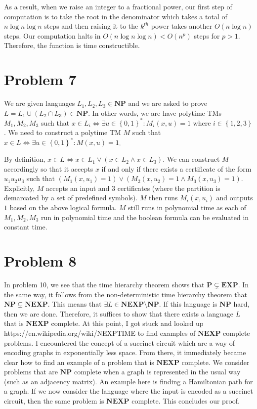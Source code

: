 \documentclass[usletter]{article}
\begin{document}
As a result, when we raise an integer to a fractional power, our first step of computation is to take the root in the denominator which takes a total of \(n \log n \log n\) steps and then raising it to the \(k^{th}\) power takes another \(O(n\log n)\) steps. 
Our computation halts in \(O(n \log n \log n) < O(n^p)\) steps for \( p > 1\). Therefore, the function is time constructible. 

\newpage

\section*{Problem 7}

We are given languages \(L_1, L_2, L_3 \in \mathbf{NP}\) and we are asked to prove \(L = L_1 \cup (L_2 \cap L_3) \in \mathbf{NP}\).
In other words, we are have polytime TMs \(M_1, M_2, M_3\) such that \(x \in L_i \iff \exists u \in \left\{0,1\right\}^* : M_i(x,u) = 1\)
where \(i \in \left\{1,2,3\right\}\). We need to construct a polytime TM \(M\) such that \(x \in L \iff \exists u \in \left\{ 0,1 \right\}^* : M(x,u) = 1\).

By definition, \(x \in L \iff x \in L_1 \lor (x\in L_2 \land x \in L_3)\). We can construct \(M\) accordingly so that it accepts \(x\) if and only if there exists a 
certificate of the form \(u_1u_2u_3\) such that \((M_1(x,u_1) = 1) \lor (M_2(x,u_2) = 1 \land M_3(x,u_3) = 1)\). Explicitly, \(M\) accepts an input and 3 certificates 
(where the partition is demarcated by a set of predefined symbols). \(M\) then runs \(M_i(x,u_i)\) and outputs \(1\) based on the above logical formula. \(M\) still runs in polynomial time
as each of \(M_1, M_2, M_3\) run in polynomial time and the boolean formula can be evaluated in constant time. 

\newpage

\section*{Problem 8}

In problem 10, we see that the time hierarchy theorem shows that \(\mathbf{P} \subsetneq \mathbf{EXP}\). In the same way, it follows from the non-deterministic time hierarchy theorem that 
\(\mathbf{NP}\subsetneq \mathbf{NEXP}\). This means that \(\exists L \in \mathbf{NEXP}\setminus \mathbf{NP}\). If this language is \(\mathbf{NP}\) hard, then we are done. Therefore, it suffices to show that
there exists a language \(L\) that is \(\mathbf{NEXP}\) complete. At this point, I got stuck and looked up https://en.wikipedia.org/wiki/NEXPTIME to find examples of \(\mathbf{NEXP}\) complete problems. I encountered the concept of
a succinct circuit which are a way of encoding graphs in exponentially less space. From there, it immediately became clear how to find an example of a problem that is \(\mathbf{NEXP}\) complete. We consider problems that are \(\mathbf{NP}\) complete
when a graph is represented in the usual way (such as an adjacency matrix). An example here is finding a Hamiltonian path for a graph. If we now consider the language where the input is encoded as a succinct circuit, then the same problem is \(\mathbf{NEXP}\) complete. 
This concludes our proof. 
\end{document}

